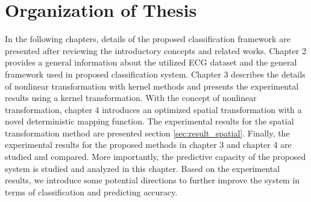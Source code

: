 \section{Organization of Thesis}

In the following chapters, details of the proposed classification framework are presented after reviewing the introductory concepts and related works. Chapter 2 provides a general information about the utilized ECG dataset and the general framework used in proposed classification system. Chapter 3 describes the details of nonlinear transformation with kernel methods and presents the experimental results using a kernel transformation. With the concept of nonlinear transformation, chapter 4 introduces an optimized spatial transformation with a novel deterministic mapping function. The experimental results for the spatial transformation method are presented section \ref{sec:result_spatial}. Finally, the experimental results for the proposed methods in chapter 3 and chapter 4 are studied and compared. More importantly, the predictive capacity of the proposed system is studied and analyzed in this chapter. Based on the experimental results, we introduce some potential directions to further improve the system in terms of classification and predicting accuracy.
